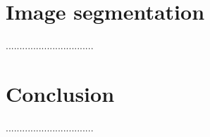 \section{Image segmentation}\label{sec:image-segmentation}
        ................................


\section{Conclusion}\label{sec:conclusion-ch1}
        ................................
